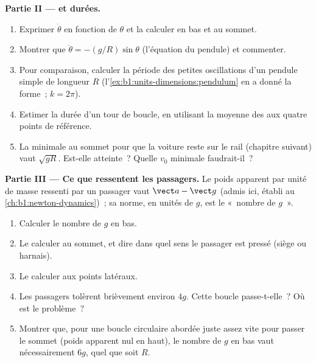 \begin{problem}
\medskip
\noindent\textbf{Partie II ---  et durées.}
\begin{enumerate}[resume]
  \item Exprimer $\dot\theta$ en fonction de $\theta$ et la calculer en
        bas et au sommet.
  \item Montrer que $\ddot\theta = -(g/R)\sin\theta$ (l'équation du
        pendule) et commenter.
  \item Pour comparaison, calculer la période des petites oscillations
        d'un pendule simple de longueur $R$
        (l'\cref{ex:b1:units-dimensions:pendulum} en a donné la forme~;
        $k = 2\pi$).
  \item Estimer la durée d'un tour de boucle, en utilisant la moyenne
        des  aux quatre points de référence.
  \item La  minimale au sommet pour que la voiture reste sur le
        rail (chapitre suivant) vaut $\sqrt{gR}$. Est-elle atteinte~?
        Quelle $v_0$ minimale faudrait-il~?
\end{enumerate}

\medskip
\noindent\textbf{Partie III --- Ce que ressentent les passagers.}
Le poids apparent par unité de masse ressenti par un passager vaut
$\vect a - \vect g$ (admis ici, établi au
\cref{ch:b1:newton-dynamics})~; sa norme, en unités de $g$, est le
«~nombre de $g$~».
\begin{enumerate}[resume]
  \item Calculer le nombre de $g$ en bas.
  \item Le calculer au sommet, et dire dans quel sens le passager est
        pressé (siège ou harnais).
  \item Le calculer aux points latéraux.
  \item Les passagers tolèrent brièvement environ $4g$. Cette boucle
        passe-t-elle~? Où est le problème~?
  \item Montrer que, pour une boucle circulaire abordée juste assez vite
        pour passer le sommet (poids apparent nul en haut), le nombre de
        $g$ en bas vaut nécessairement $6g$, quel que soit $R$.
\end{enumerate}


\end{problem}
